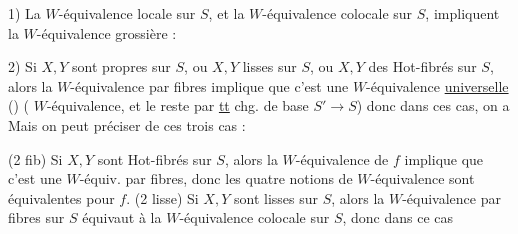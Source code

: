 1) La $W$-équivalence locale sur $S$, et la $W$-équivalence colocale sur $S$, impliquent la $W$-équivalence grossière :

2) Si $X,Y$ sont propres sur $S$, ou $X,Y$ lisses sur $S$, ou $X,Y$ des Hot-fibrés sur $S$, alors la $W$-équivalence par fibres implique que c'est une $W$-équivalence \uline{universelle} () ( $W$-équivalence, et le reste par \uline{tt} chg. de base $S'\longrightarrow S$) donc dans ces  cas, on a
Mais on peut préciser   de ces trois cas :

\unsure{--}(2 fib) Si $X,Y$ sont Hot-fibrés sur $S$, alors la $W$-équivalence  de $f$ implique que c'est une $W$-équiv. par fibres, donc les quatre notions de $W$-équivalence sont équivalentes pour $f$.
(2 lisse) Si $X,Y$ sont lisses sur $S$, alors la $W$-équivalence par fibres sur $S$ équivaut à la $W$-équivalence colocale sur $S$,  donc dans ce cas

